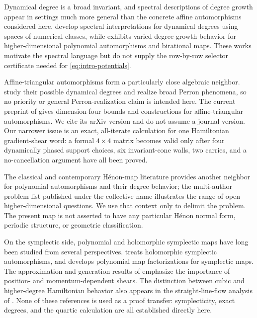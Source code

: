 \documentclass[11pt]{article}
\theoremstyle{remark}
\numberwithin{equation}{section}
\begin{document}
Dynamical degree is a broad invariant, and spectral descriptions of degree
growth appear in settings much more general than the concrete affine
automorphisms considered here.  \citet{DangFavreSpectralInterpretations}
develop spectral interpretations for dynamical degrees using spaces of
numerical classes, while \citet{DesertiDegreeGrowthExamples} exhibits varied
degree-growth behavior for higher-dimensional polynomial automorphisms and
birational maps.  These works motivate the spectral language but do not
supply the row-by-row selector certificate needed for
\eqref{eq:intro-potentials}.

Affine-triangular automorphisms form a particularly close algebraic
neighbor.  \citet{BlancVanSantenAffineTriangular} study their possible
dynamical degrees and realize broad Perron phenomena, so no priority or
general Perron-realization claim is intended here.  The current preprint of
\citet{ShaoSunDimensionFour} gives dimension-four bounds and constructions
for affine-triangular automorphisms.  We cite its arXiv version and do not
assume a journal version.  Our narrower issue is an exact, all-iterate
calculation for one Hamiltonian gradient-shear word: a formal \(4\times4\)
matrix becomes valid only after four dynamically phased support choices,
six invariant-cone walls, two carries, and a no-cancellation argument have
all been proved.

The classical and contemporary Hénon-map literature provides another
neighbor for polynomial automorphisms and their degree behavior; the
multi-author problem list published under the collective name
\citet{HenonOpenProblems} illustrates the range of open higher-dimensional
questions.  We use that context only to delimit the problem.  The present
map is not asserted to have any particular Hénon normal form, periodic
structure, or geometric classification.

On the symplectic side, polynomial and holomorphic symplectic maps have long
been studied from several perspectives.  \citet{ForstnericComplexSymplectic}
treats holomorphic symplectic automorphisms, and
\citet{RangarajanPolynomialSymplectic} develops polynomial map
factorizations for symplectic maps.  The approximation and generation
results of \citet{BergerTuraevHamiltonianMaps} emphasize the importance of
position- and momentum-dependent shears.  The distinction between cubic and
higher-degree Hamiltonian behavior also appears in the straight-line-flow
analysis of \citet{KochLomeliStraightLineFlows}.  None of these references is
used as a proof transfer: symplecticity, exact degrees, and the quartic
calculation are all established directly here.
\end{document}
